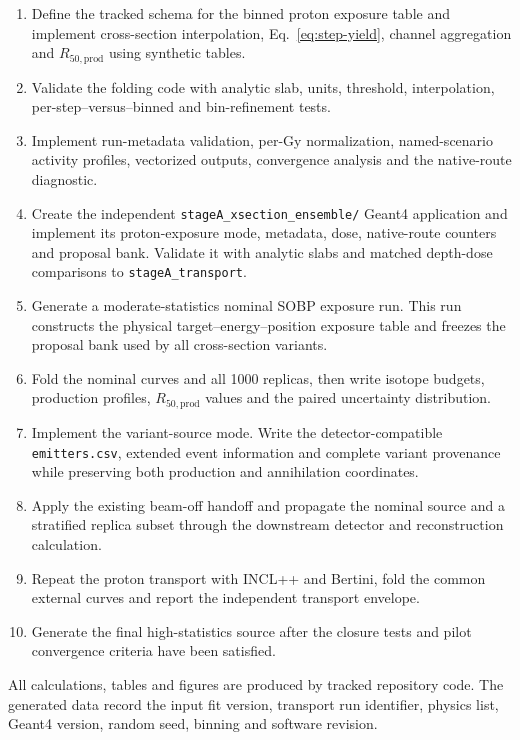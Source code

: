 \documentclass[11pt]{article}
\newcommand{\file}[1]{\texttt{#1}}
\begin{document}
\begin{enumerate}
  \item Define the tracked schema for the binned proton exposure table and
        implement cross-section interpolation, Eq.~\eqref{eq:step-yield},
        channel aggregation and $R_{50,\mathrm{prod}}$ using synthetic tables.
  \item Validate the folding code with analytic slab, units, threshold,
        interpolation, per-step--versus--binned and bin-refinement tests.
  \item Implement run-metadata validation, per-Gy normalization, named-scenario
        activity profiles, vectorized outputs, convergence analysis and the
        native-route diagnostic.
  \item Create the independent \file{stageA\_xsection\_ensemble/} Geant4
        application and implement its proton-exposure mode, metadata, dose,
        native-route counters and proposal bank.  Validate it with analytic
        slabs and matched depth-dose comparisons to \file{stageA\_transport}.
  \item Generate a moderate-statistics nominal SOBP exposure run.  This run
        constructs the physical target--energy--position exposure table and
        freezes the proposal bank used by all cross-section variants.
  \item Fold the nominal curves and all 1000 replicas, then write isotope
        budgets, production profiles, $R_{50,\mathrm{prod}}$ values and the
        paired uncertainty distribution.
  \item Implement the variant-source mode.  Write the detector-compatible
        \file{emitters.csv}, extended event information and complete variant
        provenance while preserving both production and annihilation
        coordinates.
  \item Apply the existing beam-off handoff and propagate the nominal source
        and a stratified replica subset through the downstream detector and
        reconstruction calculation.
  \item Repeat the proton transport with INCL++ and Bertini, fold the common
        external curves and report the independent transport envelope.
  \item Generate the final high-statistics source after the closure tests and
        pilot convergence criteria have been satisfied.
\end{enumerate}

All calculations, tables and figures are produced by tracked repository code.
The generated data record the input fit version, transport run identifier,
physics list, Geant4 version, random seed, binning and software revision.
\end{document}
